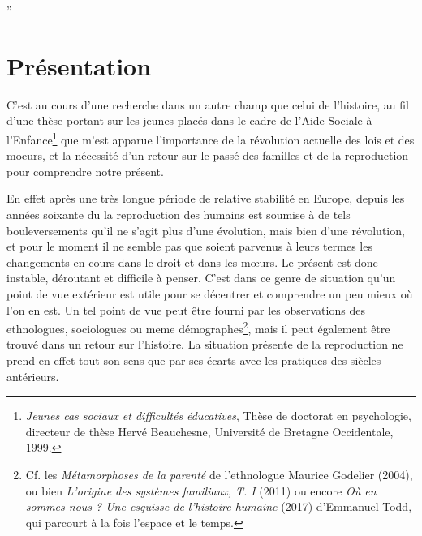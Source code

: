 

”\chapter{Présentation}







C'est au cours d'une recherche dans un autre champ que celui de l'histoire, au fil d'une thèse portant sur les jeunes placés dans le cadre de l'Aide Sociale à l'Enfance\footnote{\emph{Jeunes cas sociaux et difficultés éducatives}, Thèse de doctorat en psychologie, directeur de thèse Hervé Beauchesne, Université de Bretagne Occidentale, 1999.} que m'est apparue l'importance de la révolution actuelle des lois et des moeurs, et la nécessité d'un retour sur le passé des familles et de la reproduction pour comprendre notre présent. 

En effet après une très longue période de relative stabilité en Europe, depuis les années soixante du  la reproduction des humains
est  soumise à de tels bouleversements   
qu'il ne s'agit plus d'une évolution, mais bien d'une révolution, et pour le moment il
ne semble pas que soient parvenus à leurs termes les changements en
cours dans le droit et dans les mœurs. Le présent est donc instable, déroutant et difficile à penser. C'est dans ce genre de situation qu'un point de vue extérieur est utile pour se décentrer et comprendre un peu mieux où l'on en est. Un tel point de vue peut être fourni par les observations des ethnologues, sociologues ou meme démographes\footnote{Cf. les \emph{Métamorphoses de la parenté} de l'ethnologue Maurice Godelier (2004), ou bien \emph{L'origine des systèmes familiaux, T. I} (2011) ou encore \emph{Où en sommes-nous ? Une esquisse de l'histoire humaine} (2017) d'Emmanuel Todd, qui parcourt à la fois l'espace et le temps.}, mais il peut également être trouvé dans un retour sur l'histoire. La situation présente de la reproduction ne prend en effet tout son sens que par ses écarts avec les pratiques des siècles antérieurs.








